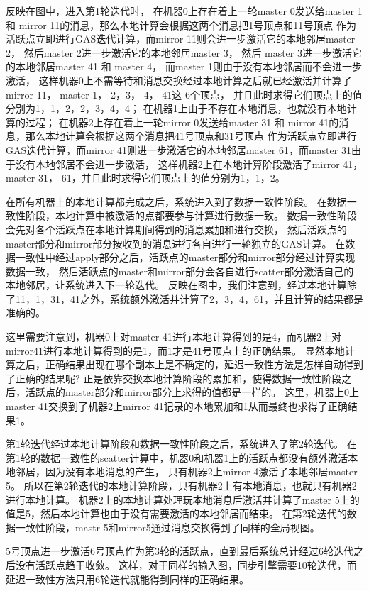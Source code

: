 反映在图中，进入第1轮迭代时，
在机器0上存在着上一轮master 0发送给master 1 和 mirror 11的消息，那么本地计算会根据这两个消息把1号顶点和11号顶点
作为活跃点立即进行GAS迭代计算，而mirror 11则会进一步激活它的本地邻居master 2，
然后master 2进一步激活它的本地邻居master 3， 然后 master 3进一步激活它的本地邻居master 41 和 master 4，
而master 1则由于没有本地邻居而不会进一步激活，
这样机器0上不需等待和消息交换经过本地计算之后就已经激活并计算了mirror 11， master 1， 2，3， 4， 41这 6个顶点，
并且此时求得它们顶点上的值分别为1，1，2，2，3，4，4；
在机器1上由于不存在本地消息，也就没有本地计算的过程；
在机器2上存在着上一轮mirror 0发送给master 31 和 mirror 41的消息，那么本地计算会根据这两个消息把41号顶点和31号顶点
作为活跃点立即进行GAS迭代计算，而mirror 41则进一步激活它的本地邻居master 61，而master 31由于没有本地邻居不会进一步激活，
这样机器2上在本地计算阶段激活了mirror 41， master 31， 61，并且此时求得它们顶点上的值分别为1，1，2。

在所有机器上的本地计算都完成之后，系统进入到了数据一致性阶段。
在数据一致性阶段，本地计算中被激活的点都要参与计算进行数据一致。
数据一致性阶段会先对各个活跃点在本地计算期间得到的消息累加和进行交换，
然后活跃点的master部分和mirror部分按收到的消息进行各自进行一轮独立的GAS计算。
在数据一致性中经过apply部分之后，活跃点的master部分和mirror部分经过计算实现数据一致，
然后活跃点的master和mirror部分会各自进行scatter部分激活自己的本地邻居，让系统进入下一轮迭代。
反映在图中，我们注意到，经过本地计算除了11，1，31，41之外，系统额外激活并计算了2，3，4，61，并且计算的结果都是准确的。

这里需要注意到，机器0上对master 41进行本地计算得到的是4，而机器2上对mirror41进行本地计算得到的是1，而1才是41号顶点上的正确结果。
显然本地计算之后，正确结果出现在哪个副本上是不确定的，延迟一致性方法是怎样自动得到了正确的结果呢? 
正是依靠交换本地计算阶段的累加和，使得数据一致性阶段之后，活跃点的master部分和mirror部分上求得的值都是一样的。
这里，机器上0上master 41交换到了机器2上mirror 41记录的本地累加和1从而最终也求得了正确结果1。

第1轮迭代经过本地计算阶段和数据一致性阶段之后，系统进入了第2轮迭代。
在第1轮的数据一致性的scatter计算中，机器0和机器1上的活跃点都没有额外激活本地邻居，因为没有本地消息的产生，
只有机器2上mirror 4激活了本地邻居master 5。
所以在第2轮迭代的本地计算阶段，只有机器2上有本地消息，也就只有机器2进行本地计算。
机器2上的本地计算处理玩本地消息后激活并计算了master 5上的值是5，然后本地计算也由于没有需要激活的本地邻居而结束。
在第2轮迭代的数据一致性阶段，mastr 5和mirror5通过消息交换得到了同样的全局视图。

5号顶点进一步激活6号顶点作为第3轮的活跃点，直到最后系统总计经过6轮迭代之后没有活跃点趋于收敛。
这样，对于同样的输入图，同步引擎需要10轮迭代，而延迟一致性方法只用6轮迭代就能得到同样的正确结果。



